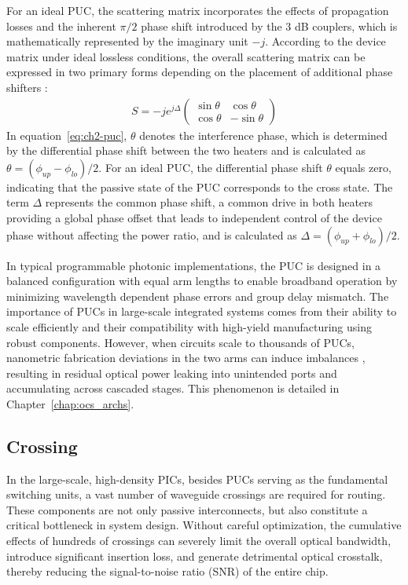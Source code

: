 For an ideal PUC, the scattering matrix incorporates the effects of propagation losses and the inherent $\pi/2$ phase shift introduced by the 3 dB couplers, which is mathematically represented by the imaginary unit $-j$.
According to the device matrix under ideal lossless conditions, the overall scattering matrix can be expressed in two primary forms depending on the placement of additional phase shifters \cite{capmany2020programmable}:
\begin{equation}
    \label{eq:ch2-puc}
    \begin{aligned}
        S = -j e^{j\Delta}
        \begin{pmatrix}
            \sin\theta & \cos\theta  \\
            \cos\theta & -\sin\theta
        \end{pmatrix}
    \end{aligned}
\end{equation}
In equation~\eqref{eq:ch2-puc}, $\theta$ denotes the interference phase, which is determined by the differential phase shift between the two heaters and is calculated as $\theta = (\phi_{up} - \phi_{lo})/2$.
For an ideal PUC, the differential phase shift $\theta$ equals zero, indicating that the passive state of the PUC corresponds to the cross state.
The term $\Delta$ represents the common phase shift, a common drive in both heaters providing a global phase offset that leads to independent control of the device phase without affecting the power ratio, and is calculated as $\Delta = (\phi_{up} + \phi_{lo})/2$.

In typical programmable photonic implementations, the PUC is designed in a balanced configuration with equal arm lengths to enable broadband operation by minimizing wavelength dependent phase errors and group delay mismatch.
The importance of PUCs in large-scale integrated systems comes from their ability to scale efficiently and their compatibility with high-yield manufacturing using robust components.
However, when circuits scale to thousands of PUCs, nanometric fabrication deviations in the two arms can induce imbalances \cite{song2022toward}, resulting in residual optical power leaking into unintended ports and accumulating across cascaded stages.
This phenomenon is detailed in Chapter~\ref{chap:ocs_archs}.

\subsection{Crossing}\label{sub:crossing} %
In the large-scale, high-density PICs, besides PUCs serving as the fundamental switching units, a vast number of waveguide crossings are required for routing.
These components are not only passive interconnects, but also constitute a critical bottleneck in system design.
Without careful optimization, the cumulative effects of hundreds of crossings can severely limit the overall optical bandwidth, introduce significant insertion loss, and generate detrimental optical crosstalk, thereby reducing the signal-to-noise ratio (SNR) of the entire chip.

